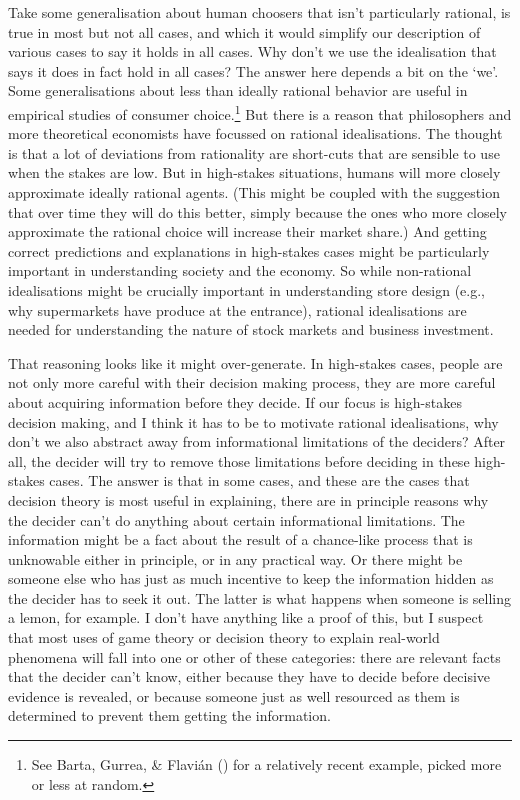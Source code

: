 \documentclass[
  12pt,
  letterpaper,
  DIV=11,
  numbers=noendperiod]{scrreprt}
\begin{document}
Take some generalisation about human choosers that isn't particularly
rational, is true in most but not all cases, and which it would simplify
our description of various cases to say it holds in all cases. Why don't
we use the idealisation that says it does in fact hold in all cases? The
answer here depends a bit on the `we'. Some generalisations about less
than ideally rational behavior are useful in empirical studies of
consumer choice.\footnote{See Barta, Gurrea, \& Flavián
  () for a relatively recent example,
  picked more or less at random.} But there is a reason that
philosophers and more theoretical economists have focussed on rational
idealisations. The thought is that a lot of deviations from rationality
are short-cuts that are sensible to use when the stakes are low. But in
high-stakes situations, humans will more closely approximate ideally
rational agents. (This might be coupled with the suggestion that over
time they will do this better, simply because the ones who more closely
approximate the rational choice will increase their market share.) And
getting correct predictions and explanations in high-stakes cases might
be particularly important in understanding society and the economy. So
while non-rational idealisations might be crucially important in
understanding store design (e.g., why supermarkets have produce at the
entrance), rational idealisations are needed for understanding the
nature of stock markets and business investment.

That reasoning looks like it might over-generate. In high-stakes cases,
people are not only more careful with their decision making process,
they are more careful about acquiring information before they decide. If
our focus is high-stakes decision making, and I think it has to be to
motivate rational idealisations, why don't we also abstract away from
informational limitations of the deciders? After all, the decider will
try to remove those limitations before deciding in these high-stakes
cases. The answer is that in some cases, and these are the cases that
decision theory is most useful in explaining, there are in principle
reasons why the decider can't do anything about certain informational
limitations. The information might be a fact about the result of a
chance-like process that is unknowable either in principle, or in any
practical way. Or there might be someone else who has just as much
incentive to keep the information hidden as the decider has to seek it
out. The latter is what happens when someone is selling a lemon, for
example. I don't have anything like a proof of this, but I suspect that
most uses of game theory or decision theory to explain real-world
phenomena will fall into one or other of these categories: there are
relevant facts that the decider can't know, either because they have to
decide before decisive evidence is revealed, or because someone just as
well resourced as them is determined to prevent them getting the
information.
\end{document}
